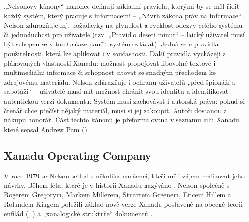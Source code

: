 „Nelsonovy kánony“ nakonec definují základní pravidla, kterými by se měl řídit každý systém, který pracuje s informacemi -- „Návrh zákona práv na informace“ \autocite[DM58]{Nelson1974}. Nelson zdůrazňuje mj. požadavky na plynulost a rychlost odezvy celého systému či jednoduchost pro uživatele (tzv. „Pravidlo deseti minut“ -- laický uživatel musí být schopen se v tomto čase naučit systém ovládat). Jedná se o pravidla použitelnosti, která lze aplikovat i v současnosti. Další pravidla vycházejí z plánovaných vlastností Xanadu: možnost propojovat libovolné textové i multimediální informace či schopnost citovat se snadným přechodem ke zdrojovému materiálu. Nelson zdůrazňuje i ochranu uživatelů „před špionáží a sabotáží“ -- uživatelé musí mít možnost chránit svou identitu a identifikovat autentickou verzi dokumentu. Systém musí zachovávat i autorská práva: pokud si čtenář chce přečíst nějaký materiál, musí si jej zakoupit. Autoři dostanou z nákupu honorář. Část těchto kánonů je přeformulovaná v seznamu cílů Xanadu které sepsal Andrew Pam ().



\subsection{Xanadu Operating Company}

V roce 1979 se Nelson setkal s několika nadšenci, kteří měli zájem realizovat jeho návrhy. Během léta, které je v historii Xanadu nazýváno , Nelson společně s Rogerem Gregorym, Markem Millerem, Stuartem Greenem, Ericem Hillem a Rolandem Kingem položili základ nové verze Xanadu postavené na obecné teorii enfilád (\cite{xuhistory}; ) a „xanalogické struktuře“ dokumentů \autocite[17.13]{intertw:Nelson}.

